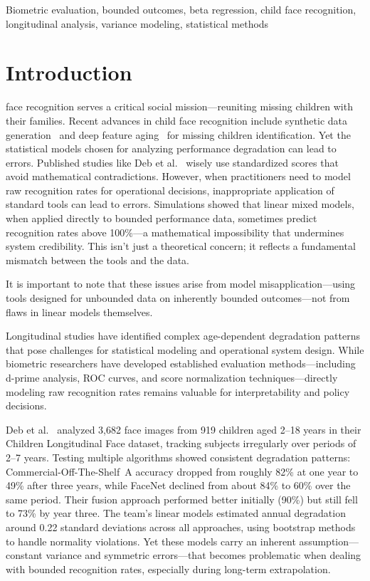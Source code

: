 \documentclass[10pt,journal,compsoc]{IEEEtran}
\begin{document}
\begin{IEEEkeywords}
Biometric evaluation, bounded outcomes, beta regression, child face recognition, longitudinal analysis, variance modeling, statistical methods
\end{IEEEkeywords}

\IEEEpeerreviewmaketitle

\section{Introduction}
\label{sec:introduction}
 face recognition serves a critical social mission---reuniting missing children with their families. Recent advances in child face recognition include synthetic data generation~\cite{falkenberg2024} and deep feature aging~\cite{deb2021missing} for missing children identification. Yet the statistical models chosen for analyzing performance degradation can lead to errors. Published studies like Deb et al.~\cite{deb2018} wisely use standardized scores that avoid mathematical contradictions. However, when practitioners need to model raw recognition rates for operational decisions, inappropriate application of standard tools can lead to errors. Simulations showed that linear mixed models, when applied directly to bounded performance data, sometimes predict recognition rates above 100\%---a mathematical impossibility that undermines system credibility. This isn't just a theoretical concern; it reflects a fundamental mismatch between the tools and the data.

It is important to note that these issues arise from model misapplication---using tools designed for unbounded data on inherently bounded outcomes---not from flaws in linear models themselves.

Longitudinal studies have identified complex age-dependent degradation patterns that pose challenges for statistical modeling and operational system design. While biometric researchers have developed established evaluation methods---including d-prime analysis, ROC curves, and score normalization techniques---directly modeling raw recognition rates remains valuable for interpretability and policy decisions.

Deb et al.~\cite{deb2018} analyzed 3,682 face images from 919 children aged 2--18 years in their Children Longitudinal Face dataset, tracking subjects irregularly over periods of 2--7 years. Testing multiple algorithms showed consistent degradation patterns: Commercial-Off-The-Shelf~A accuracy dropped from roughly 82\% at one year to 49\% after three years, while FaceNet declined from about 84\% to 60\% over the same period. Their fusion approach performed better initially (90\%) but still fell to 73\% by year three. The team's linear models estimated annual degradation around 0.22 standard deviations across all approaches, using bootstrap methods to handle normality violations. Yet these models carry an inherent assumption---constant variance and symmetric errors---that becomes problematic when dealing with bounded recognition rates, especially during long-term extrapolation.
\end{document}
